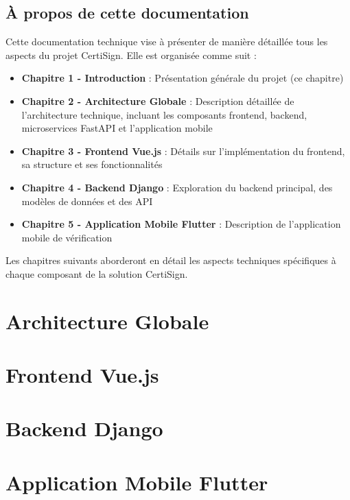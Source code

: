 \documentclass[a4paper,12pt]{report}
\begin{document}
\section{À propos de cette documentation}

Cette documentation technique vise à présenter de manière détaillée tous les aspects du projet CertiSign. Elle est organisée comme suit :

\begin{itemize}
    \item \textbf{Chapitre 1 - Introduction} : Présentation générale du projet (ce chapitre)
    \item \textbf{Chapitre 2 - Architecture Globale} : Description détaillée de l'architecture technique, incluant les composants frontend, backend, microservices FastAPI et l'application mobile
    \item \textbf{Chapitre 3 - Frontend Vue.js} : Détails sur l'implémentation du frontend, sa structure et ses fonctionnalités
    \item \textbf{Chapitre 4 - Backend Django} : Exploration du backend principal, des modèles de données et des API
    \item \textbf{Chapitre 5 - Application Mobile Flutter} : Description de l'application mobile de vérification
\end{itemize}

Les chapitres suivants aborderont en détail les aspects techniques spécifiques à chaque composant de la solution CertiSign.

\chapter{Architecture Globale}

\chapter{Frontend Vue.js}

\chapter{Backend Django}

\chapter{Application Mobile Flutter}
\end{document}
